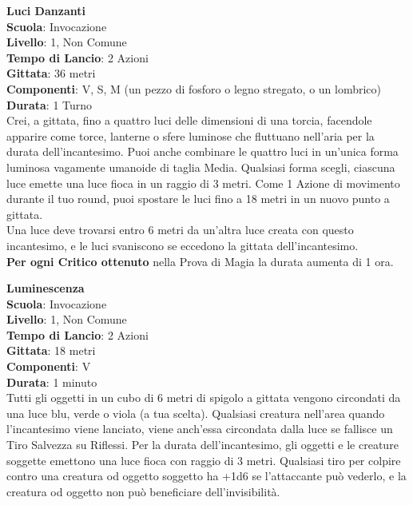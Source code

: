 \begin{multicols}{2}
\medskip\textbf{Luci Danzanti}\\
\textbf{Scuola}: Invocazione\\
\textbf{Livello}: 1, Non Comune\\
\textbf{Tempo di Lancio}: 2 Azioni\\
\textbf{Gittata}: 36 metri\\
\textbf{Componenti}: V, S, M (un pezzo di fosforo o legno stregato, o un lombrico)\\
\textbf{Durata}: 1 Turno\\
Crei, a gittata, fino a quattro luci delle dimensioni di una torcia, facendole apparire come torce, lanterne o sfere luminose che fluttuano nell'aria per la durata dell'incantesimo. Puoi anche combinare le quattro luci in un'unica forma luminosa vagamente umanoide di taglia Media. Qualsiasi forma scegli, ciascuna luce emette una luce fioca in un raggio di 3 metri. Come 1 Azione di movimento durante il tuo round, puoi spostare le luci fino a 18 metri in un nuovo punto a gittata.\\
Una luce deve trovarsi entro 6 metri da un'altra luce creata con questo incantesimo, e le luci svaniscono se eccedono la gittata dell'incantesimo.\\
\textbf{Per ogni Critico ottenuto} nella Prova di Magia la durata aumenta di 1 ora.

\medskip\textbf{Luminescenza}\\
\textbf{Scuola}: Invocazione\\
\textbf{Livello}: 1, Non Comune\\
\textbf{Tempo di Lancio}: 2 Azioni\\
\textbf{Gittata}: 18 metri\\
\textbf{Componenti}: V\\
\textbf{Durata}: 1 minuto \\
Tutti gli oggetti in un cubo di 6 metri di spigolo a gittata vengono circondati da una luce blu, verde o viola (a tua scelta). Qualsiasi creatura nell'area quando l'incantesimo viene lanciato, viene anch'essa circondata dalla luce se fallisce un Tiro Salvezza su Riflessi. Per la durata dell'incantesimo, gli oggetti e le creature soggette emettono una luce fioca con raggio di 3 metri. Qualsiasi tiro per colpire contro una creatura od oggetto soggetto ha +1d6 se l'attaccante può vederlo, e la creatura od oggetto non può beneficiare dell'invisibilità.


\end{multicols}
